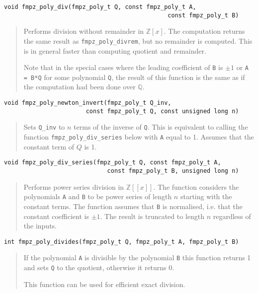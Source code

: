 \documentclass[a4paper,10pt]{article}
\newcommand{\Z}{\mathbb{Z}}
\newcommand{\Q}{\mathbb{Q}}
\newcommand{\code}{\lstinline}
\begin{document}
\begin{lstlisting}
void fmpz_poly_div(fmpz_poly_t Q, const fmpz_poly_t A, 
                                              const fmpz_poly_t B) 
\end{lstlisting}
\begin{quote}
Performs division without remainder in $\Z[x]$. The computation returns the same result as \code{fmpz_poly_divrem}, but no remainder is computed. This is in general faster than computing quotient and remainder. 

Note that in the special cases where the leading coefficient of \code{B} is $\pm 1$ or \code{A = B*Q} for some polynomial \code{Q}, the result of this function is the same as if the computation had been done over $\Q$. 
\end{quote}

\begin{lstlisting}
void fmpz_poly_newton_invert(fmpz_poly_t Q_inv, 
                       const fmpz_poly_t Q, const unsigned long n)  
\end{lstlisting}
\begin{quote}
Sets \code{Q_inv} to $n$ terms of the inverse of \code{Q}. This is equivalent to calling the function \code{fmpz_poly_div_series} below with \code{A} equal to 1. Assumes that the constant term of $Q$ is 1. 
\end{quote}

\begin{lstlisting}
void fmpz_poly_div_series(fmpz_poly_t Q, const fmpz_poly_t A, 
                             const fmpz_poly_t B, unsigned long n) 
\end{lstlisting}
\begin{quote}
Performs power series division in $\Z[[x]]$. The function considers the polynomials \code{A} and \code{B} to be power series of length $n$ starting with the constant terms. The function assumes that \code{B} is normalised, i.e. that the constant coefficient is $\pm 1$. The result is truncated to length $n$ regardless of the inputs.
\end{quote}

\begin{lstlisting}
int fmpz_poly_divides(fmpz_poly_t Q, fmpz_poly_t A, fmpz_poly_t B)
\end{lstlisting}
\begin{quote}
If the polynomial \code{A} is divisible by the polynomial \code{B} this function returns 1 and sets \code{Q} to the quotient, otherwise it returns 0.

This function can be used for efficient exact division. 
\end{quote}
\end{document}
